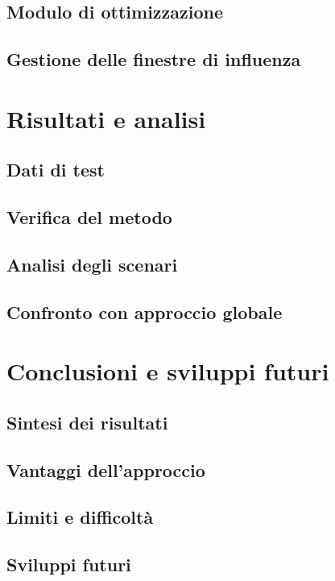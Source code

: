 \documentclass[a4paper,12pt]{report}
\begin{document}
\section{Modulo di ottimizzazione}
\section{Gestione delle finestre di influenza}

\chapter{Risultati e analisi}
\section{Dati di test}
\section{Verifica del metodo}
\section{Analisi degli scenari}
\section{Confronto con approccio globale}

\chapter{Conclusioni e sviluppi futuri}
\section{Sintesi dei risultati}
\section{Vantaggi dell’approccio}
\section{Limiti e difficoltà}
\section{Sviluppi futuri}

\end{document}
